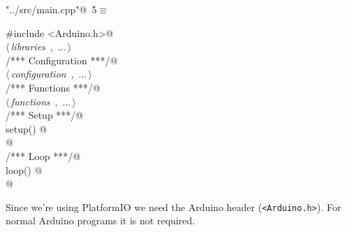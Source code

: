 \documentclass[a4paper, 11pt]{article}
\begin{document}
\begin{flushleft} \small
\begin{minipage}{\linewidth}\label{scrap1}\raggedright\small
{}\verb@"../src/main.cpp"@\nobreak\ {\footnotesize{5}}$\equiv$
\vspace{-1ex}
\begin{list}{}{\setlength{\leftmargin}{1em}} \item
\mbox{}\lstinline@#include <Arduino.h>@\\
\mbox{}\lstinline@@$\langle\,${\itshape libraries}\ {\footnotesize {}},\ ...\,$\rangle\,$\verb@@\\
\mbox{}\lstinline@/*** Configuration ***/@\\
\mbox{}\lstinline@@$\langle\,${\itshape configuration}\ {\footnotesize {}},\ ...\,$\rangle\,$\verb@@\\
\mbox{}\lstinline@/*** Functions ***/@\\
\mbox{}\lstinline@@$\langle\,${\itshape functions}\ {\footnotesize {}},\ ...\,$\rangle\,$\verb@@\\
\mbox{}\lstinline@/*** Setup ***/@\\
\mbox{}\lstinline@void setup() @\\
\mbox{}@\\
\mbox{}\lstinline@/*** Loop ***/@\\
\mbox{}\lstinline@void loop() @\\
\mbox{}@\\
\mbox{}{\NWsep}
\end{list}
\vspace{-1ex}
\end{minipage}
\end{flushleft}

Since we're using PlatformIO we need the Arduino header (\verb|<Arduino.h>|).
For normal Arduino programs it is not required.
\end{document}
